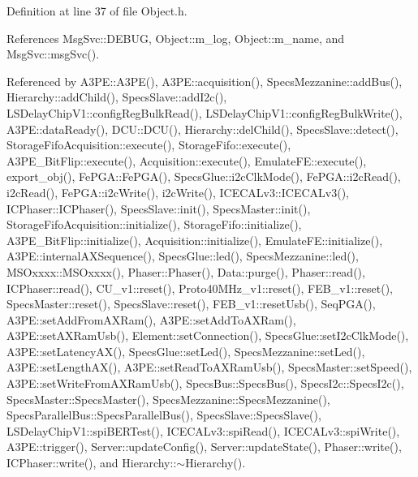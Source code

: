 Definition at line 37 of file Object.\+h.



References Msg\+Svc\+::\+D\+E\+B\+UG, Object\+::m\+\_\+log, Object\+::m\+\_\+name, and Msg\+Svc\+::msg\+Svc().



Referenced by A3\+P\+E\+::\+A3\+P\+E(), A3\+P\+E\+::acquisition(), Specs\+Mezzanine\+::add\+Bus(), Hierarchy\+::add\+Child(), Specs\+Slave\+::add\+I2c(), L\+S\+Delay\+Chip\+V1\+::config\+Reg\+Bulk\+Read(), L\+S\+Delay\+Chip\+V1\+::config\+Reg\+Bulk\+Write(), A3\+P\+E\+::data\+Ready(), D\+C\+U\+::\+D\+C\+U(), Hierarchy\+::del\+Child(), Specs\+Slave\+::detect(), Storage\+Fifo\+Acquisition\+::execute(), Storage\+Fifo\+::execute(), A3\+P\+E\+\_\+\+Bit\+Flip\+::execute(), Acquisition\+::execute(), Emulate\+F\+E\+::execute(), export\+\_\+obj(), Fe\+P\+G\+A\+::\+Fe\+P\+G\+A(), Specs\+Glue\+::i2c\+Clk\+Mode(), Fe\+P\+G\+A\+::i2c\+Read(), i2c\+Read(), Fe\+P\+G\+A\+::i2c\+Write(), i2c\+Write(), I\+C\+E\+C\+A\+Lv3\+::\+I\+C\+E\+C\+A\+Lv3(), I\+C\+Phaser\+::\+I\+C\+Phaser(), Specs\+Slave\+::init(), Specs\+Master\+::init(), Storage\+Fifo\+Acquisition\+::initialize(), Storage\+Fifo\+::initialize(), A3\+P\+E\+\_\+\+Bit\+Flip\+::initialize(), Acquisition\+::initialize(), Emulate\+F\+E\+::initialize(), A3\+P\+E\+::internal\+A\+X\+Sequence(), Specs\+Glue\+::led(), Specs\+Mezzanine\+::led(), M\+S\+Oxxxx\+::\+M\+S\+Oxxxx(), Phaser\+::\+Phaser(), Data\+::purge(), Phaser\+::read(), I\+C\+Phaser\+::read(), C\+U\+\_\+v1\+::reset(), Proto40\+M\+Hz\+\_\+v1\+::reset(), F\+E\+B\+\_\+v1\+::reset(), Specs\+Master\+::reset(), Specs\+Slave\+::reset(), F\+E\+B\+\_\+v1\+::reset\+Usb(), Seq\+P\+G\+A(), A3\+P\+E\+::set\+Add\+From\+A\+X\+Ram(), A3\+P\+E\+::set\+Add\+To\+A\+X\+Ram(), A3\+P\+E\+::set\+A\+X\+Ram\+Usb(), Element\+::set\+Connection(), Specs\+Glue\+::set\+I2c\+Clk\+Mode(), A3\+P\+E\+::set\+Latency\+A\+X(), Specs\+Glue\+::set\+Led(), Specs\+Mezzanine\+::set\+Led(), A3\+P\+E\+::set\+Length\+A\+X(), A3\+P\+E\+::set\+Read\+To\+A\+X\+Ram\+Usb(), Specs\+Master\+::set\+Speed(), A3\+P\+E\+::set\+Write\+From\+A\+X\+Ram\+Usb(), Specs\+Bus\+::\+Specs\+Bus(), Specs\+I2c\+::\+Specs\+I2c(), Specs\+Master\+::\+Specs\+Master(), Specs\+Mezzanine\+::\+Specs\+Mezzanine(), Specs\+Parallel\+Bus\+::\+Specs\+Parallel\+Bus(), Specs\+Slave\+::\+Specs\+Slave(), L\+S\+Delay\+Chip\+V1\+::spi\+B\+E\+R\+Test(), I\+C\+E\+C\+A\+Lv3\+::spi\+Read(), I\+C\+E\+C\+A\+Lv3\+::spi\+Write(), A3\+P\+E\+::trigger(), Server\+::update\+Config(), Server\+::update\+State(), Phaser\+::write(), I\+C\+Phaser\+::write(), and Hierarchy\+::$\sim$\+Hierarchy().


